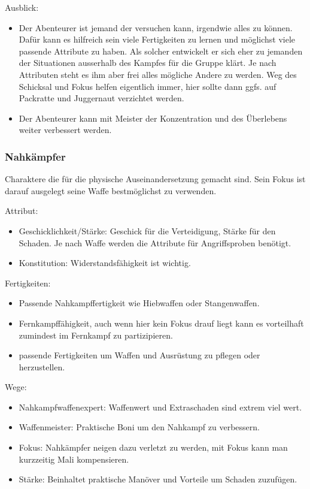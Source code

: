 \documentclass{article}
\begin{document}
Ausblick:
\begin{itemize}
\item Der Abenteurer ist jemand der versuchen kann, irgendwie alles zu können. Dafür kann es hilfreich sein viele Fertigkeiten zu lernen und möglichst viele passende Attribute zu haben. Als solcher entwickelt er sich eher zu jemanden der Situationen ausserhalb des Kampfes für die Gruppe klärt. Je nach Attributen steht es ihm aber frei alles mögliche Andere zu werden. Weg des Schicksal und Fokus helfen eigentlich immer, hier sollte dann ggfs. auf Packratte und Juggernaut verzichtet werden.
\item Der Abenteurer kann mit Meister der Konzentration und des Überlebens weiter verbessert werden.
\end{itemize}

\subsubsection{Nahkämpfer}
Charaktere die für die physische Auseinandersetzung gemacht sind. Sein Fokus ist darauf ausgelegt seine Waffe
bestmöglichst zu verwenden.

Attribut:
\begin{itemize}
\item Geschicklichkeit/Stärke: Geschick für die Verteidigung, Stärke für den Schaden. Je nach Waffe werden die Attribute für Angriffsproben benötigt.
\item Konstitution: Widerstandsfähigkeit ist wichtig.
\end{itemize}

Fertigkeiten:
\begin{itemize}
\item Passende Nahkampffertigkeit wie Hiebwaffen oder Stangenwaffen.
\item Fernkampffähigkeit, auch wenn hier kein Fokus drauf liegt kann es vorteilhaft zumindest im Fernkampf zu partizipieren.
\item passende Fertigkeiten um Waffen und Ausrüstung zu pflegen oder herzustellen.
\end{itemize}

Wege:
\begin{itemize}
\item Nahkampfwaffenexpert: Waffenwert und Extraschaden sind extrem viel wert.
\item Waffenmeister: Praktische Boni um den Nahkampf zu verbessern.
\item Fokus: Nahkämpfer neigen dazu verletzt zu werden, mit Fokus kann man kurzzeitig Mali kompensieren.
\item Stärke: Beinhaltet praktische Manöver und Vorteile um Schaden zuzufügen.
\end{itemize}
\end{document}

